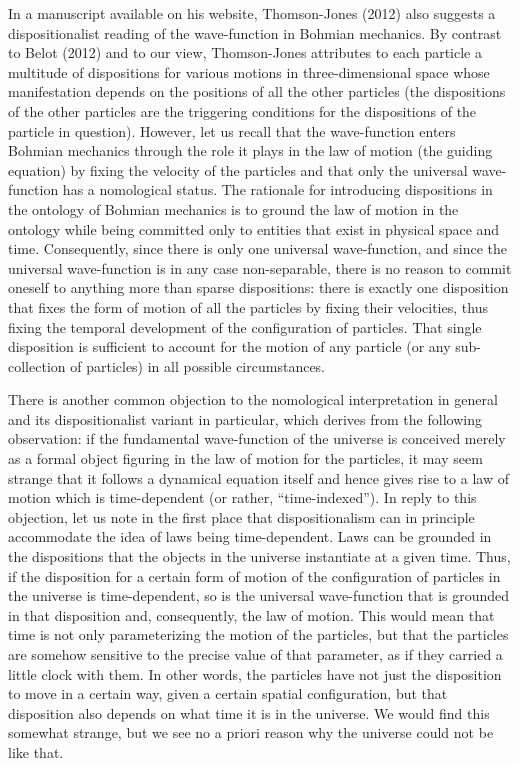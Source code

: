 \documentclass[12pt,a4paper]{article}
\theoremstyle{definition}
\begin{document}
In a manuscript available on his website, Thomson-Jones (2012) also suggests a dispositionalist reading of the wave-function in Bohmian mechanics. By contrast to Belot (2012) and to our view, Thomson-Jones attributes to each particle a multitude of dispositions for various motions in three-dimensional space whose manifestation depends on the positions of all the other particles (the dispositions of the other particles are the triggering conditions for the dispositions of the particle in question). However, let us recall that the wave-function enters Bohmian mechanics through the role it plays in the law of motion (the guiding equation) by fixing the velocity of the particles and that only the universal wave-function has a nomological status. The rationale for introducing dispositions in the ontology of Bohmian mechanics is to ground the law of motion in the ontology while being committed only to entities that exist in physical space and time. Consequently, since there is only one universal wave-function, and since the universal wave-function is in any case non-separable, there is no reason to commit oneself to anything more than sparse dispositions: there is exactly one disposition that fixes the form of motion of all the particles by fixing their velocities, thus fixing the temporal development of the configuration of particles. That single disposition is sufficient to account for the motion of any particle (or any sub-collection of particles) in all possible circumstances.

There is another common objection to the nomological interpretation in general and its dispositionalist variant in particular, which derives from the following observation: if the fundamental wave-function of the universe is conceived merely as a formal object figuring in the law of motion for the particles, it may seem strange that it follows a dynamical equation itself and hence gives rise to a law of motion which is time-dependent (or rather, ``time-indexed''). In reply to this objection, let us note in the first place that dispositionalism can in principle accommodate the idea of laws being time-dependent. Laws can be grounded in the dispositions that the objects in the universe instantiate at a given time. Thus, if the disposition for a certain form of motion of the configuration of particles in the universe is time-dependent, so is the universal wave-function that is grounded in that disposition and, consequently, the law of motion. This would mean that time is not only parameterizing the motion of the particles, but that the particles are somehow sensitive to the precise value of that parameter, as if they carried a little clock with them. In other words, the particles have not just the disposition to move in a certain way, given a certain spatial configuration, but that disposition also depends on what time it is in the universe. We would find this somewhat strange, but we see no a priori reason why the universe could not be like that.
\end{document}
